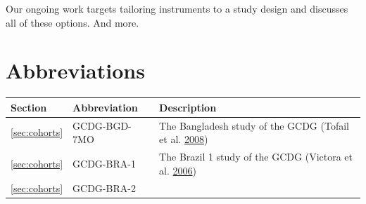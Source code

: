 \documentclass[
]{book}
\begin{document}
Our ongoing work targets tailoring instruments to a study design and discusses all of these options. And more.

\hypertarget{appendix-appendices}{%
\appendix}


\hypertarget{ap:abbreviations}{%
\chapter{Abbreviations}\label{ap:abbreviations}}

\begin{longtable}[]{@{}lll@{}}
\toprule
\begin{minipage}[b]{0.12\columnwidth}\raggedright
Section\strut
\end{minipage} & \begin{minipage}[b]{0.19\columnwidth}\raggedright
Abbreviation\strut
\end{minipage} & \begin{minipage}[b]{0.61\columnwidth}\raggedright
Description\strut
\end{minipage}\tabularnewline
\midrule
\endhead
\begin{minipage}[t]{0.12\columnwidth}\raggedright
\ref{sec:cohorts}\strut
\end{minipage} & \begin{minipage}[t]{0.19\columnwidth}\raggedright
GCDG-BGD-7MO\strut
\end{minipage} & \begin{minipage}[t]{0.61\columnwidth}\raggedright
The Bangladesh study of the GCDG (Tofail et al. \protect\hyperlink{ref-Tofail2008}{2008})\strut
\end{minipage}\tabularnewline
\begin{minipage}[t]{0.12\columnwidth}\raggedright
\ref{sec:cohorts}\strut
\end{minipage} & \begin{minipage}[t]{0.19\columnwidth}\raggedright
GCDG-BRA-1\strut
\end{minipage} & \begin{minipage}[t]{0.61\columnwidth}\raggedright
The Brazil 1 study of the GCDG (Victora et al. \protect\hyperlink{ref-Victora2006}{2006})\strut
\end{minipage}\tabularnewline
\begin{minipage}[t]{0.12\columnwidth}\raggedright
\ref{sec:cohorts}\strut
\end{minipage} & \begin{minipage}[t]{0.19\columnwidth}\raggedright
GCDG-BRA-2\strut
\end{minipage} & \begin{minipage}[t]{0.61\columnwidth}\raggedright

\end{minipage}
\end{longtable}
\end{document}
